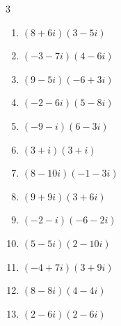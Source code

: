 \begin{multicols}{3}
\begin{enumerate}
  \item $\displaystyle (8+6i)(3-5i)$

        \phantom{$\displaystyle =54-22i$}

\columnbreak %

  \item $\displaystyle (-3-7i)(4-6i)$

        \phantom{$\displaystyle =-54-10i$}

  \item $\displaystyle (9-5i)(-6+3i)$

        \phantom{$\displaystyle =-39+57i$}

  \item $\displaystyle (-2-6i)(5-8i)$

        \phantom{$\displaystyle =-58-14i$}

  \item $\displaystyle (-9-i)(6-3i)$

        \phantom{$\displaystyle =-57+21i$}

  \item $\displaystyle (3+i)(3+i)$

        \phantom{$\displaystyle =8+6i$}

  \item $\displaystyle (8-10i)(-1-3i)$

        \phantom{$\displaystyle =-38-14i$}

  \item $\displaystyle (9+9i)(3+6i)$

        \phantom{$\displaystyle =-27+81i$}

  \item $\displaystyle (-2-i)(-6-2i)$

        \phantom{$\displaystyle =10+10i$}

  \item $\displaystyle (5-5i)(2-10i)$

        \phantom{$\displaystyle =-40-60i$}

  \item $\displaystyle (-4+7i)(3+9i)$

        \phantom{$\displaystyle =-75-15i$}

  \item $\displaystyle (8-8i)(4-4i)$

        \phantom{$\displaystyle =-64i$}

  \item $\displaystyle (2-6i)(2-6i)$


\end{enumerate}
\end{multicols}

